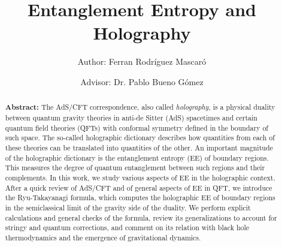 \documentclass[twocolumn]{revtex4-2}
\begin{document}
\pagestyle{fancy}


\title{Entanglement Entropy and Holography}
\author{Author: Ferran Rodríguez Mascaró}
\author{Advisor: Dr. Pablo Bueno Gómez}


\begin{abstract}
    {\bf Abstract:} The AdS/CFT correspondence, also called \emph{holography}, is a physical duality between quantum gravity theories in anti-de Sitter (AdS) spacetimes and certain quantum field theories (QFTs) with conformal symmetry defined in the boundary of such space. The so-called holographic dictionary describes how quantities from each of these theories can be translated into quantities of the other. An important magnitude of the holographic dictionary is the entanglement entropy (EE) of boundary regions. This measures the degree of quantum entanglement between such regions and their complements. In this work, we study various aspects of EE in the holographic context. After a quick review of AdS/CFT and of general aspects of EE in QFT, we introduce the Ryu-Takayanagi formula, which computes the holographic EE of boundary regions in the semiclassical limit of the gravity side of the duality. We perform explicit calculations and general checks of the formula, review its generalizations to account for stringy and quantum corrections, and comment on its relation with black hole thermodynamics and the emergence of gravitational dynamics.
\end{abstract}


\maketitle
\end{document}
